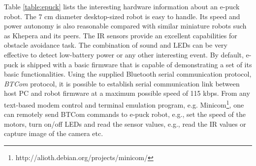 Table \ref{table:epuck} lists the interesting hardware information about an e-puck robot. The 7 cm diameter desktop-sized robot is easy to handle. Its speed and power autonomy is also reasonable compared with similar miniature robots such as Khepera and its peers. The IR sensors provide an excellent capabilities for obstacle avoidance task. The combination of sound and LEDs can be very effective to detect low-battery power or any other interesting event. By default, e-puck is shipped with a basic firmware that is capable of demonstrating a set of its basic functionalities. Using the supplied Bluetooth serial communication protocol,  {\em BTCom} protocol, it is possible to establish serial communication link between host PC and robot firmware at a maximum possible speed of 115 kbps. From any  text-based modem control and terminal emulation program, e.g. Minicom\footnote{http://alioth.debian.org/projects/minicom/}, one can remotely send BTCom commands to e-puck robot, e.g., set the speed of the motors, turn on/off LEDs and read the sensor values, e.g., read the IR values or capture image of the camera etc.
